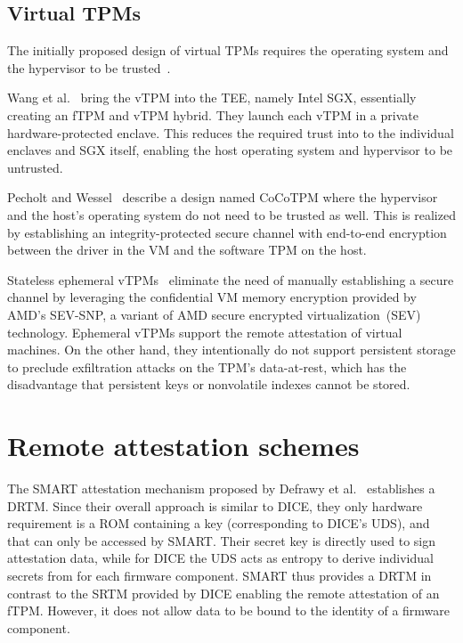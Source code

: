 \subsection{Virtual TPMs}

The initially proposed design of virtual \acp{TPM} requires the operating system and the hypervisor to be trusted~\cite{268868}.

Wang et al.~\cite{Wang2019} bring the vTPM into the \ac{TEE}, namely Intel SGX, essentially creating an fTPM and vTPM hybrid.
They launch each vTPM in a private hardware-protected enclave.
This reduces the required trust into to the individual enclaves and SGX itself, enabling the host operating system and hypervisor to be untrusted.

Pecholt and Wessel~\cite{Pecholt2022} describe a design named CoCoTPM where the hypervisor and the host's operating system do not need to be trusted as well.
This is realized by establishing an integrity-protected secure channel with end-to-end encryption between the driver in the VM and the software TPM on the host.

Stateless ephemeral vTPMs~\cite{Narayanan2023} eliminate the need of manually establishing a secure channel by leveraging the confidential VM memory encryption provided by AMD's SEV-SNP, a variant of AMD secure encrypted virtualization~(SEV) technology.
Ephemeral vTPMs support the remote attestation of virtual machines.
On the other hand, they intentionally do not support persistent storage to preclude exfiltration attacks on the TPM's data-at-rest, which has the disadvantage that persistent keys or nonvolatile indexes cannot be stored.

\section{Remote attestation schemes}



The SMART attestation mechanism proposed by Defrawy et al.~\cite{EURECOM+3536} establishes a \ac{DRTM}.
Since their overall approach is similar to \ac{DICE}, they only hardware requirement is a ROM containing a key (corresponding to DICE's \ac{UDS}), and that can only be accessed by SMART\@.
Their secret key is directly used to sign attestation data, while for \ac{DICE} the \ac{UDS} acts as entropy to derive individual secrets from for each firmware component.
SMART thus provides a \ac{DRTM} in contrast to the \ac{SRTM} provided by \ac{DICE} enabling the remote attestation of an \ac{fTPM}.
However, it does not allow data to be bound to the identity of a firmware component.

